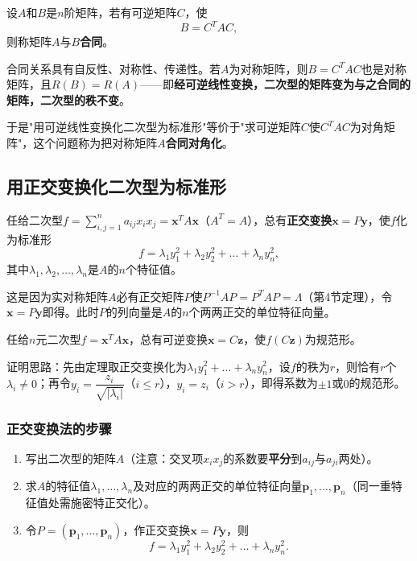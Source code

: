 \begin{definition}[合同]
设$A$和$B$是$n$阶矩阵，若有可逆矩阵$C$，使
\[
B=C^{T}AC,
\]
则称矩阵$A$与$B$\textbf{合同}。
\end{definition}

合同关系具有自反性、对称性、传递性。若$A$为对称矩阵，则$B=C^{T}AC$也是对称矩阵，且$R(B)=R(A)$——即\textbf{经可逆线性变换，二次型的矩阵变为与之合同的矩阵，二次型的秩不变}。

于是"用可逆线性变换化二次型为标准形"等价于"求可逆矩阵$C$使$C^{T}AC$为对角矩阵"，这个问题称为把对称矩阵$A$\textbf{合同对角化}。

\subsection{用正交变换化二次型为标准形}
\begin{theorem}[正交变换化标准形]
任给二次型$f=\sum_{i,j=1}^{n}a_{ij}x_ix_j=\boldsymbol{x}^{T}A\boldsymbol{x}$（$A^{T}=A$），总有\textbf{正交变换}$\boldsymbol{x}=P\boldsymbol{y}$，使$f$化为标准形
\[
f=\lambda_1y_1^{2}+\lambda_2y_2^{2}+\dots+\lambda_ny_n^{2},
\]
其中$\lambda_1,\lambda_2,\dots,\lambda_n$是$A$的$n$个特征值。
\end{theorem}

这是因为实对称矩阵$A$必有正交矩阵$P$使$P^{-1}AP=P^{T}AP=\Lambda$（第4节定理），令$\boldsymbol{x}=P\boldsymbol{y}$即得。此时$P$的列向量是$A$的$n$个两两正交的单位特征向量。

\begin{corollary}
任给$n$元二次型$f=\boldsymbol{x}^{T}A\boldsymbol{x}$，总有可逆变换$\boldsymbol{x}=C\boldsymbol{z}$，使$f(C\boldsymbol{z})$为规范形。
\end{corollary}

证明思路：先由定理取正交变换化为$\lambda_1y_1^{2}+\dots+\lambda_ny_n^{2}$，设$f$的秩为$r$，则恰有$r$个$\lambda_i\ne0$；再令$y_i=\dfrac{z_i}{\sqrt{|\lambda_i|}}$（$i\le r$），$y_i=z_i$（$i>r$），即得系数为$\pm1$或$0$的规范形。

\subsubsection{正交变换法的步骤}
\begin{enumerate}
    \item 写出二次型的矩阵$A$（注意：交叉项$x_ix_j$的系数要\textbf{平分}到$a_{ij}$与$a_{ji}$两处）。
    \item 求$A$的特征值$\lambda_1,\dots,\lambda_n$及对应的两两正交的单位特征向量$\boldsymbol{p}_1,\dots,\boldsymbol{p}_n$（同一重特征值处需施密特正交化）。
    \item 令$P=(\boldsymbol{p}_1,\dots,\boldsymbol{p}_n)$，作正交变换$\boldsymbol{x}=P\boldsymbol{y}$，则
    \[
    f=\lambda_1y_1^{2}+\lambda_2y_2^{2}+\dots+\lambda_ny_n^{2}.
    \]
\end{enumerate}

